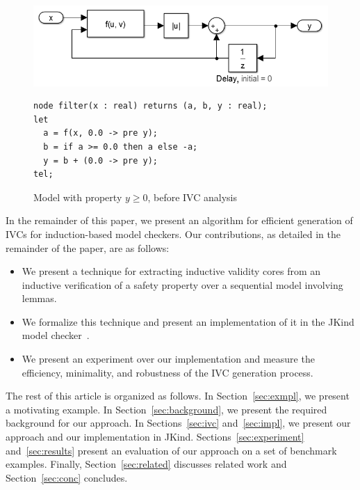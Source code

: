 \begin{figure}[t]
\centering
\includegraphics[width=\columnwidth]{figs/simulink.png}
{\smaller
\begin{verbatim}
node filter(x : real) returns (a, b, y : real);
let
  a = f(x, 0.0 -> pre y);
  b = if a >= 0.0 then a else -a;
  y = b + (0.0 -> pre y);
tel;
\end{verbatim}
}
\caption{Model with property $y \geq 0$, before IVC analysis}
\label{fig:ex-before}
\end{figure}

In the remainder of this paper, we present an algorithm for efficient generation of IVCs for induction-based model checkers.  Our contributions, as detailed in the remainder of the paper, are as follows:

\begin{itemize}
    \item We present a technique for extracting inductive validity
      cores from an inductive verification of a safety property over a sequential model involving lemmas.
    \item We formalize this technique and present an implementation of it in the JKind model checker~\cite{jkind}.
    \item We present an experiment over our implementation and measure the efficiency, minimality, and robustness of the IVC generation process.
\end{itemize}

The rest of this article is organized as follows. In
Section~\ref{sec:exmpl}, we present a motivating example. In
Section~\ref{sec:background}, we present the required background for
our approach. In Sections~\ref{sec:ivc} and~\ref{sec:impl}, we present
our approach and our implementation in JKind.
Sections~\ref{sec:experiment} and~\ref{sec:results} present an
evaluation of our approach on a set of benchmark examples. Finally,
Section~\ref{sec:related} discusses related work and
Section~\ref{sec:conc} concludes.

